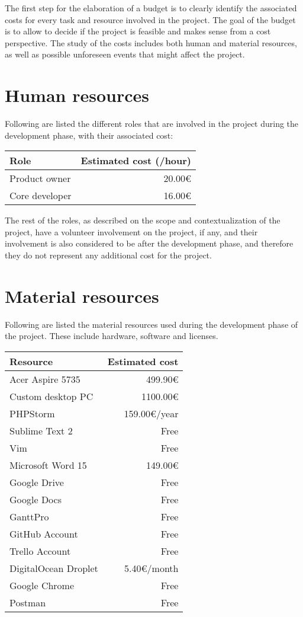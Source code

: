 The first step for the elaboration of a budget is to clearly identify the associated costs for every task and resource involved in the project. The goal of the budget is to allow to decide if the project is feasible and makes sense from a cost perspective. The study of the costs includes both human and material resources, as well as possible unforeseen events that might affect the project.

\section{Human resources}
Following are listed the different roles that are involved in the project during the development phase, with their associated cost:
\hfill\break
\begin{center}
    \begin{tabular}{ | l | r |}
    	\hline
 		\textbf{Role} & \textbf{Estimated cost (/hour)} \\ \hline
 		Product owner & 20.00\euro{} \\ \hline
 		Core developer & 16.00\euro{} \\ \hline
    \end{tabular}
\end{center}
\hfill\break
The rest of the roles, as described on the scope and contextualization of the project, have a volunteer involvement on the project, if any, and their involvement is also considered to be after the development phase, and therefore they do not represent any additional cost for the project.

\section{Material resources}
Following are listed the material resources used during the development phase of the project. These include hardware, software and licenses.
\hfill\break
\begin{center}
    \begin{tabular}{ | l | r |}
    	\hline
 		\textbf{Resource} & \textbf{Estimated cost} \\ \hline
 		Acer Aspire 5735 & 499.90\euro{} \\ \hline
 		Custom desktop PC & 1100.00\euro{} \\ \hline
 		PHPStorm & 159.00\euro{}/year \\ \hline
 		Sublime Text 2 & Free \\ \hline
 		Vim & Free \\ \hline
 		Microsoft Word 15 & 149.00\euro{} \\ \hline
 		Google Drive & Free \\ \hline
 		Google Docs & Free \\ \hline
 		GanttPro & Free \\ \hline
 		GitHub Account & Free \\ \hline
 		Trello Account & Free \\ \hline
 		DigitalOcean Droplet & 5.40\euro{}/month \\ \hline
 		Google Chrome & Free \\ \hline
 		Postman & Free \\ \hline
    \end{tabular}
\end{center}
